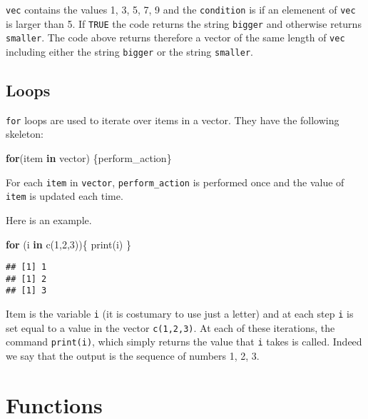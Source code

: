 \documentclass[
]{book}
\newenvironment{Shaded}{\begin{snugshade}}{\end{snugshade}}
\newcommand{\ControlFlowTok}[1]{\textcolor[rgb]{0.13,0.29,0.53}{\textbf{#1}}}
\newcommand{\DecValTok}[1]{\textcolor[rgb]{0.00,0.00,0.81}{#1}}
\newcommand{\FunctionTok}[1]{\textcolor[rgb]{0.00,0.00,0.00}{#1}}
\newcommand{\NormalTok}[1]{#1}
\begin{document}
\texttt{vec} contains the values 1, 3, 5, 7, 9 and the \texttt{condition} is if an elemenent of \texttt{vec} is larger than 5. If \texttt{TRUE} the code returns the string \texttt{bigger} and otherwise returns \texttt{smaller}. The code above returns therefore a vector of the same length of \texttt{vec} including either the string \texttt{bigger} or the string \texttt{smaller}.

\hypertarget{loops}{%
\subsection{Loops}\label{loops}}

\texttt{for} loops are used to iterate over items in a vector. They have the following skeleton:

\begin{Shaded}
\begin{Highlighting}[]
\ControlFlowTok{for}\NormalTok{(item }\ControlFlowTok{in}\NormalTok{ vector) \{perform\_action\}}
\end{Highlighting}
\end{Shaded}

For each \texttt{item} in \texttt{vector}, \texttt{perform\_action} is performed once and the value of \texttt{item} is updated each time.

Here is an example.

\begin{Shaded}
\begin{Highlighting}[]
\ControlFlowTok{for}\NormalTok{ (i }\ControlFlowTok{in} \FunctionTok{c}\NormalTok{(}\DecValTok{1}\NormalTok{,}\DecValTok{2}\NormalTok{,}\DecValTok{3}\NormalTok{))\{}
  \FunctionTok{print}\NormalTok{(i)}
\NormalTok{\}}
\end{Highlighting}
\end{Shaded}

\begin{verbatim}
## [1] 1
## [1] 2
## [1] 3
\end{verbatim}

Item is the variable \texttt{i} (it is costumary to use just a letter) and at each step \texttt{i} is set equal to a value in the vector \texttt{c(1,2,3)}. At each of these iterations, the command \texttt{print(i)}, which simply returns the value that \texttt{i} takes is called. Indeed we say that the output is the sequence of numbers 1, 2, 3.

\hypertarget{functions}{%
\section{Functions}\label{functions}}
\end{document}
